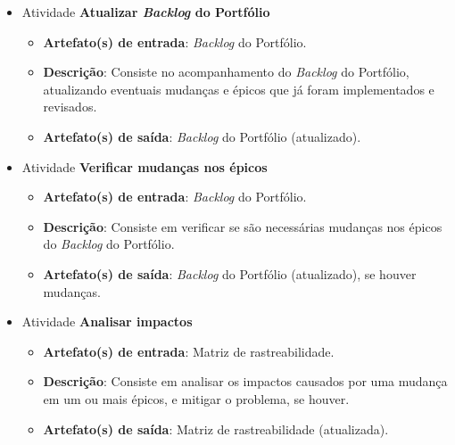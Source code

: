 \begin{itemize}
\begin{itemize}
	 \item Atividade \textbf{Atualizar \textit{Backlog} do Portfólio}
	    
	    \begin{itemize}
	      \item \textbf{Artefato(s) de entrada}: \textit{Backlog} do Portfólio.

	      \item \textbf{Descrição}: Consiste no acompanhamento do \textit{Backlog} do Portfólio, atualizando eventuais
		mudanças e épicos que já foram implementados e revisados.
	      
	      \item \textbf{Artefato(s) de saída}: \textit{Backlog} do Portfólio (atualizado).
		    
	    \end{itemize}
	    
	 \item Atividade \textbf{Verificar mudanças nos épicos}
	    
	    \begin{itemize}
	      \item \textbf{Artefato(s) de entrada}: \textit{Backlog} do Portfólio.

	      \item \textbf{Descrição}: Consiste em verificar se são necessárias mudanças nos épicos do
		\textit{Backlog} do Portfólio.
	      
	      \item \textbf{Artefato(s) de saída}: \textit{Backlog} do Portfólio (atualizado), se houver mudanças.
		    
	    \end{itemize}
	    
	 \item Atividade \textbf{Analisar impactos}
	    
	    \begin{itemize}
	      \item \textbf{Artefato(s) de entrada}: Matriz de rastreabilidade.

	      \item \textbf{Descrição}: Consiste em analisar os impactos causados por uma mudança em um ou
		mais épicos, e mitigar o problema, se houver.
	      
	      \item \textbf{Artefato(s) de saída}: Matriz de rastreabilidade (atualizada).
		    
	    \end{itemize}
	    
	\end{itemize}
     
    \end{itemize}
    
    \vfill